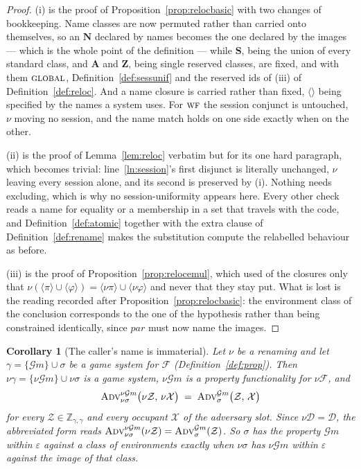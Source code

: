 \documentclass[11pt,a4paper]{article}
\newcommand{\admits}{\mathbf{N}}
\newcommand{\Apid}{\mathbf{A}}
\newcommand{\Zpid}{\mathbf{Z}}
\newcommand{\Spid}{\mathbf{S}}
\newcommand{\pars}{\mathit{par}}
\newcommand{\WF}{\op{wf}}
\newcommand{\F}{\mathcal{F}}
\newcommand{\Zenv}{\mathcal{Z}}
\newcommand{\Dum}{\mathcal{D}}
\newcommand{\advtg}{\op{Adv}}
\newcommand{\ZenvSet}{\mathbb{Z}}
\newcommand{\op}[1]{\textsc{#1}}
\newcommand{\Gm}{\mathcal{G}m}
\newcommand{\ncl}[1]{\langle #1 \rangle}
\theoremstyle{accentdef}
\theoremstyle{accentplain}
\newtheorem{corollary}[definition]{Corollary}
\begin{document}
\begin{proof}
(i) is the proof of Proposition~\ref{prop:relocbasic} with two changes of bookkeeping. Name classes are
now permuted rather than carried onto themselves, so an $\admits$ declared by names becomes the one
declared by the images --- which is the whole point of the definition --- while $\Spid$, being the union
of every standard class, and $\Apid$ and $\Zpid$, being single reserved classes, are fixed, and with
them $\op{global}$, Definition~\ref{def:sessunif} and the reserved ids of (iii) of
Definition~\ref{def:reloc}. And a name closure is carried rather than fixed, $\ncl{}$ being specified by
the names a system uses. For $\WF$ the session conjunct is untouched, $\nu$ moving no session, and the
name match holds on one side exactly when on the other.

(ii) is the proof of Lemma~\ref{lem:reloc} verbatim but for its one hard paragraph, which becomes
trivial: line~\ref{ln:session}'s first disjunct is literally unchanged, $\nu$ leaving every session
alone, and its second is preserved by (i). Nothing needs excluding, which is why no session-uniformity
appears here. Every other check reads a name for equality or a membership in a set that travels with
the code, and Definition~\ref{def:atomic} together with the extra clause of
Definition~\ref{def:rename} makes the substitution compute the relabelled behaviour as before.

(iii) is the proof of Proposition~\ref{prop:relocemul}, which used of the closures only that
$\nu(\ncl{\pi} \cup \ncl{\varphi}) = \ncl{\nu\pi} \cup \ncl{\nu\varphi}$ and never that they stay put.
What is lost is the reading recorded after Proposition~\ref{prop:relocbasic}: the environment class of
the conclusion corresponds to the one of the hypothesis rather than being constrained identically,
since $\pars$ must now name the images.
\end{proof}

\begin{corollary}[The caller's name is immaterial]\label{cor:callername}
Let $\nu$ be a renaming and let $\gamma = \{\Gm\} \cup \sigma$ be a game system for $\F$
(Definition~\ref{def:prop}). Then $\nu\gamma = \{\nu\Gm\} \cup \nu\sigma$ is a game system, $\nu\Gm$ is
a property functionality for $\nu\F$, and
\[
  \advtg^{\nu\Gm}_{\nu\sigma}\bigl(\nu\Zenv,\,\nu\mathcal{X}\bigr)
  \;=\;
  \advtg^{\Gm}_{\sigma}\bigl(\Zenv,\,\mathcal{X}\bigr)
\]
for every $\Zenv \in \ZenvSet_{\gamma,\gamma}$ and every occupant $\mathcal{X}$ of the adversary slot.
Since $\nu\Dum = \Dum$, the abbreviated form reads
$\advtg^{\nu\Gm}_{\nu\sigma}(\nu\Zenv) = \advtg^{\Gm}_{\sigma}(\Zenv)$.
So $\sigma$ has the property $\Gm$ within $\varepsilon$ against a class of environments exactly when
$\nu\sigma$ has $\nu\Gm$ within $\varepsilon$ against the image of that class.
\end{corollary}
\end{document}
